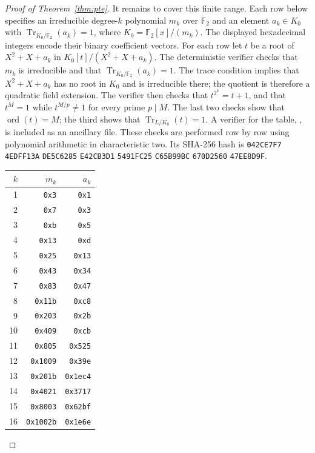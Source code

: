 \documentclass[11pt]{article}
\newcommand{\hashpart}[1]{\texttt{#1}\allowbreak}
\begin{document}
\begin{proof}[Proof of Theorem~\ref{thm:pte}]
It remains to cover this finite range. Each row below specifies an irreducible
degree-$k$ polynomial $m_k$ over $\mathbb F_2$ and an element $a_k\in K_0$
with $\operatorname{Tr}_{K_0/\mathbb F_2}(a_k)=1$, where
$K_0=\mathbb F_2[x]/(m_k)$. The displayed hexadecimal integers encode
their binary coefficient vectors.
For each row let $t$ be a root of $X^2+X+a_k$ in
$K_0[t]/(X^2+X+a_k)$. The deterministic verifier checks that $m_k$ is
irreducible and that $\operatorname{Tr}_{K_0/\mathbb F_2}(a_k)=1$.
The trace condition implies that $X^2+X+a_k$ has no root in $K_0$
and is irreducible there; the quotient is therefore a quadratic
field extension. The verifier then checks that
$t^{2^k}=t+1$, and that $t^M=1$ while $t^{M/p}\ne1$ for every prime
$p\mid M$. The last two checks show that $\operatorname{ord}(t)=M$; the
third shows that $\operatorname{Tr}_{L/K_0}(t)=1$. A verifier for the table, ,
is included as an ancillary file. These checks are performed row by row
using polynomial arithmetic in characteristic two. Its SHA-256 hash is
\hashpart{042CE7F7}%
\hashpart{4EDFF13A}%
\hashpart{DE5C6285}%
\hashpart{E42CB3D1}%
\hashpart{5491FC25}%
\hashpart{C65B99BC}%
\hashpart{670D2560}%
\hashpart{47EE8D9F}.
\begin{center}
\small
\begin{tabular}{rrr}
$k$ & $m_k$ & $a_k$\\
\hline
1 & \texttt{0x3} & \texttt{0x1}\\
2 & \texttt{0x7} & \texttt{0x3}\\
3 & \texttt{0xb} & \texttt{0x5}\\
4 & \texttt{0x13} & \texttt{0xd}\\
5 & \texttt{0x25} & \texttt{0x13}\\
6 & \texttt{0x43} & \texttt{0x34}\\
7 & \texttt{0x83} & \texttt{0x47}\\
8 & \texttt{0x11b} & \texttt{0xc8}\\
9 & \texttt{0x203} & \texttt{0x2b}\\
10 & \texttt{0x409} & \texttt{0xcb}\\
11 & \texttt{0x805} & \texttt{0x525}\\
12 & \texttt{0x1009} & \texttt{0x39e}\\
13 & \texttt{0x201b} & \texttt{0x1ec4}\\
14 & \texttt{0x4021} & \texttt{0x3717}\\
15 & \texttt{0x8003} & \texttt{0x62bf}\\
16 & \texttt{0x1002b} & \texttt{0x1e6e}\\

\end{tabular}
\end{center}
\end{proof}
\end{document}
